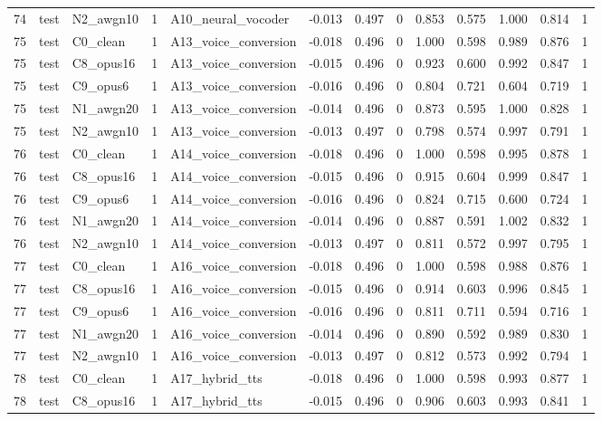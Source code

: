 \begin{tabular}{rllrlrrrrrrrr}
74 & test & N2_awgn10 & 1 & A10_neural_vocoder & -0.013 & 0.497 & 0 & 0.853 & 0.575 & 1.000 & 0.814 & 1 \\
75 & test & C0_clean & 1 & A13_voice_conversion & -0.018 & 0.496 & 0 & 1.000 & 0.598 & 0.989 & 0.876 & 1 \\
75 & test & C8_opus16 & 1 & A13_voice_conversion & -0.015 & 0.496 & 0 & 0.923 & 0.600 & 0.992 & 0.847 & 1 \\
75 & test & C9_opus6 & 1 & A13_voice_conversion & -0.016 & 0.496 & 0 & 0.804 & 0.721 & 0.604 & 0.719 & 1 \\
75 & test & N1_awgn20 & 1 & A13_voice_conversion & -0.014 & 0.496 & 0 & 0.873 & 0.595 & 1.000 & 0.828 & 1 \\
75 & test & N2_awgn10 & 1 & A13_voice_conversion & -0.013 & 0.497 & 0 & 0.798 & 0.574 & 0.997 & 0.791 & 1 \\
76 & test & C0_clean & 1 & A14_voice_conversion & -0.018 & 0.496 & 0 & 1.000 & 0.598 & 0.995 & 0.878 & 1 \\
76 & test & C8_opus16 & 1 & A14_voice_conversion & -0.015 & 0.496 & 0 & 0.915 & 0.604 & 0.999 & 0.847 & 1 \\
76 & test & C9_opus6 & 1 & A14_voice_conversion & -0.016 & 0.496 & 0 & 0.824 & 0.715 & 0.600 & 0.724 & 1 \\
76 & test & N1_awgn20 & 1 & A14_voice_conversion & -0.014 & 0.496 & 0 & 0.887 & 0.591 & 1.002 & 0.832 & 1 \\
76 & test & N2_awgn10 & 1 & A14_voice_conversion & -0.013 & 0.497 & 0 & 0.811 & 0.572 & 0.997 & 0.795 & 1 \\
77 & test & C0_clean & 1 & A16_voice_conversion & -0.018 & 0.496 & 0 & 1.000 & 0.598 & 0.988 & 0.876 & 1 \\
77 & test & C8_opus16 & 1 & A16_voice_conversion & -0.015 & 0.496 & 0 & 0.914 & 0.603 & 0.996 & 0.845 & 1 \\
77 & test & C9_opus6 & 1 & A16_voice_conversion & -0.016 & 0.496 & 0 & 0.811 & 0.711 & 0.594 & 0.716 & 1 \\
77 & test & N1_awgn20 & 1 & A16_voice_conversion & -0.014 & 0.496 & 0 & 0.890 & 0.592 & 0.989 & 0.830 & 1 \\
77 & test & N2_awgn10 & 1 & A16_voice_conversion & -0.013 & 0.497 & 0 & 0.812 & 0.573 & 0.992 & 0.794 & 1 \\
78 & test & C0_clean & 1 & A17_hybrid_tts & -0.018 & 0.496 & 0 & 1.000 & 0.598 & 0.993 & 0.877 & 1 \\
78 & test & C8_opus16 & 1 & A17_hybrid_tts & -0.015 & 0.496 & 0 & 0.906 & 0.603 & 0.993 & 0.841 & 1 \\

\end{tabular}
